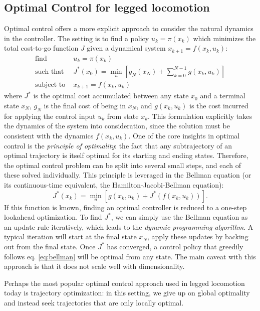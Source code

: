 \subsection{Optimal Control for legged locomotion}
Optimal control offers a more explicit approach to consider the natural dynamics in the controller.
The setting is to find a policy $u_k = \pi(x_k)$  which minimizes the total cost-to-go function $J$ given a dynamical system $x_{k+1} = f(x_k, u_k)$:
\begin{align*}
\text{find } & u_k = \pi(x_k) \\
\text{such that } & J^*(x_0) = \min_u \left[g_N(x_N) + \sum_{k=0}^{N-1}g(x_k, u_k)\right] \\
\text{subject to } & x_{k+1} = f(x_k, u_k)
\end{align*}
where $J^*$ is the optimal cost accumulated between any state $x_0$ and a terminal state $x_N$, $g_N$ is the final cost of being in $x_N$, and $g(x_k, u_k)$ is the cost incurred for applying the control input $u_k$ from state $x_k$.
This formulation explicitly takes the dynamics of the system into consideration, since the solution must be consistent with the dynamics $f(x_k, u_k)$.
One of the core insights in optimal control is the \emph{principle of optimality}: the fact that any subtrajectory of an optimal trajectory is itself optimal for its starting and ending states.
Therefore, the optimal control problem can be split into several small steps, and each of these solved individually.
This principle is leveraged in the Bellman equation (or its continuous-time equivalent, the Hamilton-Jacobi-Bellman equation):
\begin{equation}\label{eq:bellman}
J^*(x_k) = \min_u\left[g(x_k,u_k) + J^*(f(x_k, u_k)) \right].
\end{equation}
If this function is known, finding an optimal controller is reduced to a one-step lookahead optimization.
To find $J^*$, we can simply use the Bellman equation as an update rule iteratively, which leads to the \emph{dynamic programming algorithm}. A typical iteration will start at the final state $x_N$, apply these updates by backing out from the final state. Once $J^*$ has converged, a control policy that greedily follows eq. \ref{eq:bellman} will be optimal from any state.
The main caveat with this approach is that it does not scale well with dimensionality. \par
Perhaps the most popular optimal control approach used in legged locomotion today is trajectory optimization: in this setting, we give up on global optimality and instead seek trajectories that are only locally optimal.
